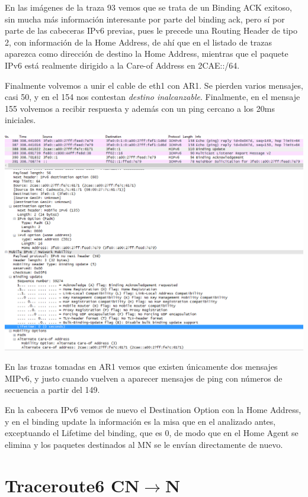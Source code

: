 \documentclass{article}
\begin{document}
En las imágenes de la traza 93 vemos que se trata de un Binding ACK exitoso, sin mucha más información interesante por parte del binding ack, pero sí por parte de las cabeceras IPv6 previas, pues le precede una Routing Header de tipo 2, con información de la Home Address, de ahí que en el listado de trazas aparezca como dirección de destino la Home Address, mientras que el paquete IPv6 está realmente dirigido a la Care-of Address en 2CAE::/64.



Finalmente volvemos a unir el cable de eth1 con AR1. Se pierden varios mensajes, casi 50, y en el 154 nos contestan \textit{destino inalcanzable}. Finalmente, en el mensaje 155 volvemos a recibir respuesta y además con un ping cercano a los 20ms iniciales.

\begin{center} 
	\includegraphics[scale=0.6]{images/bindEND.png}
\end{center}


En las trazas tomadas en AR1 vemos que existen únicamente dos mensajes MIPv6, y justo cuando vuelven a aparecer mensajes de ping con números de secuencia a partir del 149.

En la cabecera IPv6 vemos de nuevo el Destination Option con la Home Address, y en el binding update la información es la misa que en el analizado antes, exceptuando el Lifetime del binding, que es 0, de modo que en el Home Agent se elimina y los paquetes destinados al MN se le envían directamente de nuevo.



\section{Traceroute6 CN\texorpdfstring{$\rightarrow$}MN}
\end{document}
